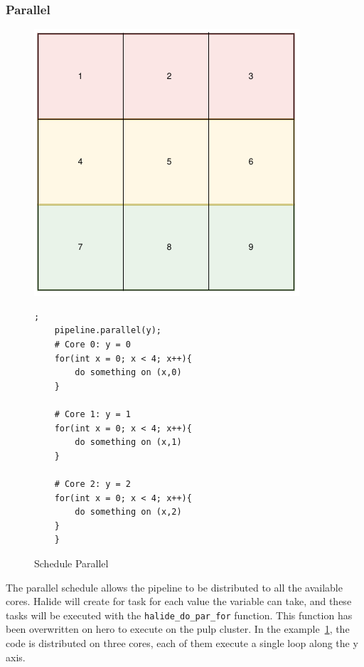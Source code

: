 \subsubsection{Parallel}
\begin{figure}[H]

		\begin{minipage}[c]{\EIW}
			\centering
		\includegraphics[width=\textwidth]{Images/Parallel.png}
		\end{minipage}
		\begin{minipage}[c]{\ECW}
			\centering
			\begin{lstlisting}[label={code:reorder}];
	pipeline.parallel(y);
	# Core 0: y = 0
	for(int x = 0; x < 4; x++){
		do something on (x,0)
	}

	# Core 1: y = 1
	for(int x = 0; x < 4; x++){
		do something on (x,1)
	}

	# Core 2: y = 2
	for(int x = 0; x < 4; x++){
		do something on (x,2)
	}
	}
\end{lstlisting}
		\end{minipage}
		\caption{Schedule Parallel}
		\label{schedule:parallel}
\end{figure}

The parallel schedule allows the pipeline to be distributed to all the available cores. Halide will create for task for each value the variable can take, and these tasks will be executed with the \verb|halide_do_par_for| function. This function has been overwritten on hero to execute on the \gls{pulp} cluster. In the example~\ref{schedule:parallel}, the code is distributed on three cores, each of them execute a single loop along the y axis.

